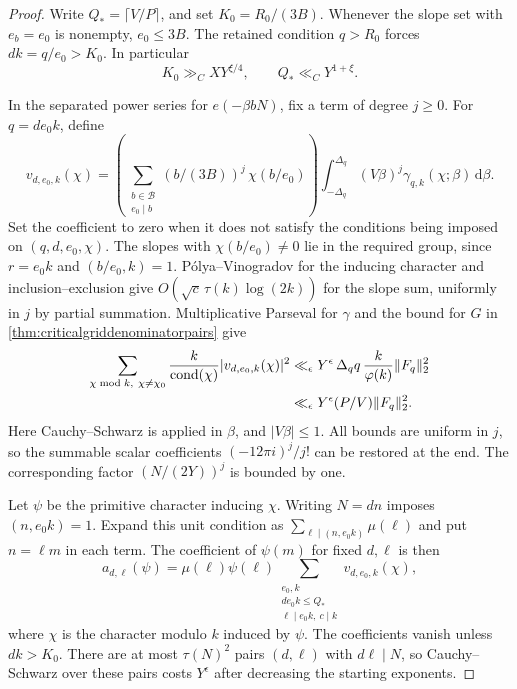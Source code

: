 \documentclass[11pt,a4paper]{article}
\numberwithin{equation}{section}
\newcommand{\ud}{\mathrm d}
\begin{document}
\begin{proof}
Write $Q_*=\lceil V/P\rceil$, and set $K_0=R_0/(3B)$.
Whenever the slope set with $e_b=e_0$ is nonempty,
$e_0\le3B$. The retained condition $q>R_0$ forces
$dk=q/e_0>K_0$. In particular
\begin{equation}
  K_0\gg_C X Y^{\xi/4},\qquad Q_*\ll_C Y^{1+\xi}.
  \label{eq:criticalgridprimitivegeometry}
\end{equation}

In the separated power series for $e(-\beta bN)$, fix
a term of degree $j\ge0$. For $q=d e_0 k$, define
\[
 v_{d,e_0,k}(\chi)=
 \left(
  \sum_{\substack{b\in\mathcal B\\e_0\mid b}}
    (b/(3B))^j\,\chi(b/e_0)
 \right)
 \int_{-\Delta_q}^{\Delta_q}(V\beta)^j
                       \gamma_{q,k}(\chi;\beta)\,\ud\beta .
\]
Set the coefficient to zero when it does not satisfy
the conditions being imposed on $(q,d,e_0,\chi)$.
The slopes with $\chi(b/e_0)\ne0$ lie in the required
group, since $r=e_0 k$ and $(b/e_0,k)=1$.
P\'olya--Vinogradov for the inducing character and
inclusion--exclusion give
$O(\sqrt c\,\tau(k)\log(2k))$ for the slope sum,
uniformly in $j$ by partial summation.
Multiplicative Parseval for $\gamma$ and the bound for
$G$ in \cref{thm:criticalgriddenominatorpairs} give
\begin{align}
 \sum_{\chi\bmod k,\ \chi\ne\chi_0}
     \frac{k}{\operatorname{cond}(\chi)}
                  |v_{d,e_0,k}(\chi)|^2
 &\ll_\epsilon
       Y^\epsilon\,\Delta_q q\,\frac{k}{\varphi(k)}
                                  \|F_q\|_2^2 \notag\\
 &\ll_\epsilon Y^\epsilon (P/V)\|F_q\|_2^2 .
 \label{eq:criticalgridprimitivecoeff}
\end{align}
Here Cauchy--Schwarz is applied in $\beta$, and
$|V\beta|\le1$. All bounds are uniform in $j$, so
the summable scalar coefficients $(-12\pi i)^j/j!$
can be restored at the end. The corresponding
factor $(N/(2Y))^j$ is bounded by one.

Let $\psi$ be the primitive character inducing $\chi$.
Writing $N=d n$ imposes $(n,e_0k)=1$. Expand this unit
condition as $\sum_{\ell\mid(n,e_0k)}\mu(\ell)$ and put
$n=\ell m$ in each term. The coefficient of $\psi(m)$
for fixed $d,\ell$ is then
\begin{equation}
 a_{d,\ell}(\psi)=\mu(\ell)\psi(\ell)
       \sum_{\substack{e_0,k\\ d e_0 k\le Q_*\\
                 \ell\mid e_0k,\ c\mid k}}
                         v_{d,e_0,k}(\chi),
 \label{eq:criticalgridprimitivegroup}
\end{equation}
where $\chi$ is the character modulo $k$ induced by $\psi$.
The coefficients vanish unless $dk>K_0$.
There are at most $\tau(N)^2$ pairs $(d,\ell)$ with
$d\ell\mid N$, so Cauchy--Schwarz over these pairs costs
$Y^\epsilon$ after decreasing the starting exponents.


\end{proof}
\end{document}

